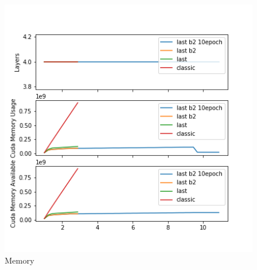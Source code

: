 \begin{figure}[h]
\centering
\includegraphics{parts/appendix/reports-gmsnn/docs_esteban-latex/test_reports/2018-06-12/history_memory.png}
\caption{Memory}
\end{figure}

